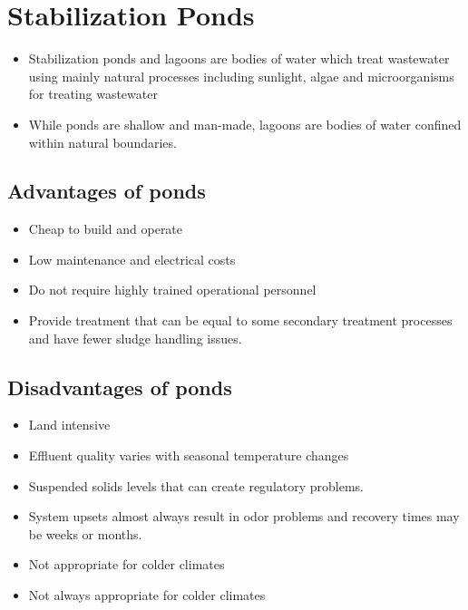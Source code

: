 
\chapter{Stabilization Ponds}

\begin{itemize}
\item Stabilization ponds and lagoons are bodies of water which treat wastewater using mainly natural processes including sunlight, algae and microorganisms for treating wastewater\\
\item While ponds are shallow and man-made, lagoons are bodies of water confined within natural boundaries.\\
\end{itemize}


\section{Advantages of ponds}	

\begin{itemize}	
\item Cheap to build and operate
\item Low maintenance and electrical costs
\item Do not require highly trained operational personnel
\item Provide treatment that can be equal to some secondary treatment processes and have fewer sludge handling issues.\\
\end{itemize}


\section{Disadvantages of ponds}	
\begin{itemize}	
\item Land intensive
\item Effluent quality varies with seasonal temperature changes
\item Suspended solids levels that can create regulatory problems.
\item System upsets almost always result in odor problems and recovery times may be weeks or months.
\item Not appropriate for colder climates
\item Not always appropriate for colder climates
\end{itemize} 

